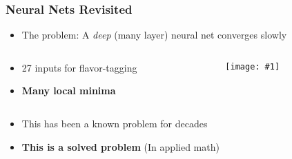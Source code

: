 \documentclass[usenames,dvipsnames]{beamer}
\newcommand{\widegraphic}[1]{\texttt{[image: \#1]}}
\begin{document}
\begin{frame}
  \frametitle{Neural Nets Revisited}
  \begin{itemize}
  \item The problem: A \emph{deep} (many layer) neural net converges slowly
  \end{itemize}
  \begin{columns}
    \begin{column}{0.5\textwidth}
      \begin{itemize}
      \item 27 inputs for flavor-tagging
      \item \textbf{Many local minima}
      \end{itemize}
    \end{column}
    \begin{column}{0.5\textwidth}
      \widegraphic{figures/tagging-graphs/complicated-train_gen.pdf}
    \end{column}
  \end{columns}
  \begin{itemize}
  \item This has been a known problem for decades
  \item \textbf{This is a solved problem} (In applied math)
  \end{itemize}
\end{frame}

\end{document}
